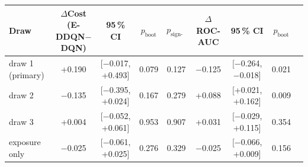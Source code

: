 \begin{tabular}{lcccccccc}
\toprule
Draw & $\Delta$Cost (E-DDQN$-$DQN) & 95\,\% CI & $p_{\text{boot}}$ & $p_{\text{sign-flip}}$ & $\Delta$ROC-AUC & 95\,\% CI & $p_{\text{boot}}$ \\
\midrule
draw 1 (primary) & +0.190 & [$-$0.017, +0.493] & 0.079 & 0.127 & $-$0.125 & [$-$0.264, $-$0.018] & 0.021 \\
draw 2 & $-$0.135 & [$-$0.395, +0.024] & 0.167 & 0.279 & +0.088 & [+0.021, +0.162] & 0.009 \\
draw 3 & +0.004 & [$-$0.052, +0.061] & 0.953 & 0.907 & +0.031 & [$-$0.029, +0.115] & 0.354 \\
exposure only & $-$0.025 & [$-$0.061, +0.025] & 0.276 & 0.329 & $-$0.025 & [$-$0.066, +0.009] & 0.156 \\
\bottomrule
\end{tabular}
